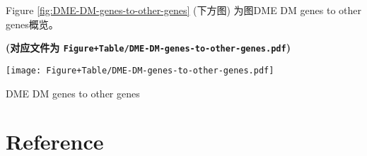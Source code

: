 \documentclass[
]{article}
\begin{document}
Figure \ref{fig:DME-DM-genes-to-other-genes} (下方图) 为图DME DM genes to other genes概览。

\textbf{(对应文件为 \texttt{Figure+Table/DME-DM-genes-to-other-genes.pdf})}

\def\@captype{figure}
\begin{center}
\texttt{[image: Figure+Table/DME-DM-genes-to-other-genes.pdf]}
\caption{DME DM genes to other genes}\label{fig:DME-DM-genes-to-other-genes}
\end{center}

\begin{center}\vspace{1.5cm}\end{center}

\hypertarget{bibliography}{%
\section*{Reference}\label{bibliography}}
\end{document}
